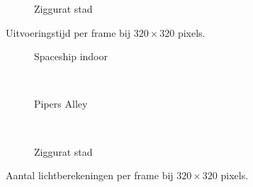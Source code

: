 \begin{figure}[t]
\begin{minipage}[t]{0.5\textwidth}
  \begin{adjustbox}{minipage=\textwidth, scale=0.55}
    \begin{subfigure}[b]{1.6\textwidth}
      \centering
      \def\svgwidth{\textwidth}
      
      \caption{Ziggurat stad}
      \label{fig:hs-ns-frame-high:exec:city}
    \end{subfigure}
  \end{adjustbox}
  \caption{\small Uitvoeringstijd per frame bij $320 \times 320$ pixels.}
  \label{fig:hs-ns-frame-high:exec}
  \end{minipage}%
  \begin{minipage}[t]{0.5\textwidth}
  \begin{adjustbox}{minipage=\textwidth, scale=0.55}
    \begin{subfigure}[b]{1.6\textwidth}
      \centering
      \def\svgwidth{\textwidth}
      
      \caption{Spaceship indoor}
      \vspace{4pt}
      \label{fig:hs-ns-frame-high:lc:indoor}
    \end{subfigure}
  \end{adjustbox} \\
  \begin{adjustbox}{minipage=\textwidth, scale=0.55}
    \begin{subfigure}[b]{1.6\textwidth}
      \centering
      \def\svgwidth{\textwidth}
      
      \caption{Pipers Alley}
      \vspace{4pt}
      \label{fig:hs-ns-frame-high:lc:alley}
    \end{subfigure}
  \end{adjustbox} \\
  \begin{adjustbox}{minipage=\textwidth, scale=0.55}
    \begin{subfigure}[b]{1.6\textwidth}
      \centering
      \def\svgwidth{\textwidth}
      
      \caption{Ziggurat stad}
      \label{fig:hs-ns-frame-high:lc:city}
    \end{subfigure}
  \end{adjustbox}
  \caption{\small Aantal lichtberekeningen per frame bij $320 \times 320$ pixels.}
  \label{fig:hs-ns-frame-high:lc}
  \end{minipage} 
\end{figure}

